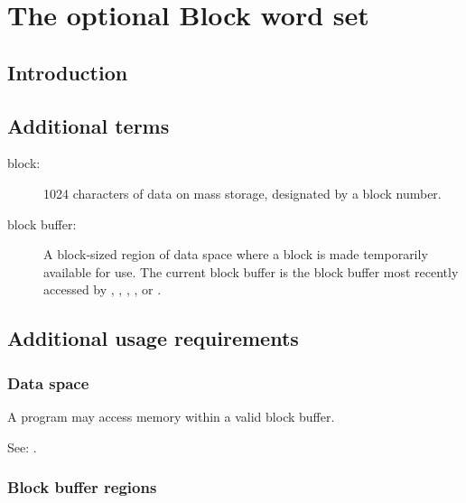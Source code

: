 \chapter{The optional Block word set} %

\section{Introduction} %

\section{Additional terms} %

\begin{description}
\item[block:]
	1024 characters of data on mass storage,
	designated by a block number.

\item[block buffer:]
	A block-sized region of data space where a block is made
	temporarily available for use. The current block buffer
	is the block buffer most recently accessed by
	, , , , or
	.
\end{description}

\section{Additional usage requirements} %

\subsection{Data space} %

A program may access memory within a valid block buffer.

See: .

\subsection{Block buffer regions} %
\label{block:buffers}

